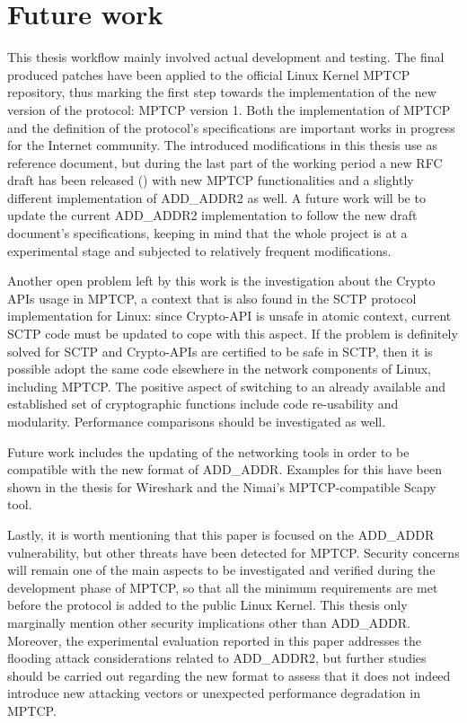 \section{Future work}
\label{future}
This thesis workflow mainly involved actual development and testing. The final produced patches have been applied to the official Linux Kernel MPTCP repository, thus marking the first step towards the implementation of the new version of the protocol: MPTCP version 1. 
Both the implementation of MPTCP and the definition of the protocol's specifications are important works in progress for the Internet community. The introduced modifications in this thesis use  as reference document, but during the last part of the working period a new RFC draft has been released () with new MPTCP functionalities and a slightly different implementation of ADD\_ADDR2 as well. A future work will be to update the current ADD\_ADDR2 implementation to follow the new draft document's specifications, keeping in mind that the whole project is at a experimental stage and subjected to relatively frequent modifications.

Another open problem left by this work is the investigation about the Crypto APIs usage in MPTCP, a context that is also found in the SCTP protocol implementation for Linux: since Crypto-API is unsafe in atomic context, current SCTP code must be updated to cope with this aspect. If the problem is definitely solved for SCTP and Crypto-APIs are certified to be safe in SCTP, then it is possible adopt the same code elsewhere in the network components of Linux, including MPTCP. The positive aspect of switching to an already available and established set of cryptographic functions include code re-usability and modularity. Performance comparisons should be investigated as well.

Future work includes the updating of the networking tools in order to be compatible with the new format of ADD\_ADDR. Examples for this have been shown in the thesis for Wireshark and the Nimai's MPTCP-compatible Scapy tool.

Lastly, it is worth mentioning that this paper is focused on the ADD\_ADDR vulnerability, but other threats have been detected for MPTCP. Security concerns will remain one of the main aspects to be investigated and verified during the development phase of MPTCP, so that all the minimum requirements are met before the protocol is added to the public Linux Kernel. This thesis only marginally mention other security implications other than ADD\_ADDR. Moreover, the experimental evaluation reported in this paper addresses the flooding attack considerations related to ADD\_ADDR2, but further studies should be carried out regarding the new format to assess that it does not indeed introduce new attacking vectors or unexpected performance degradation in MPTCP.